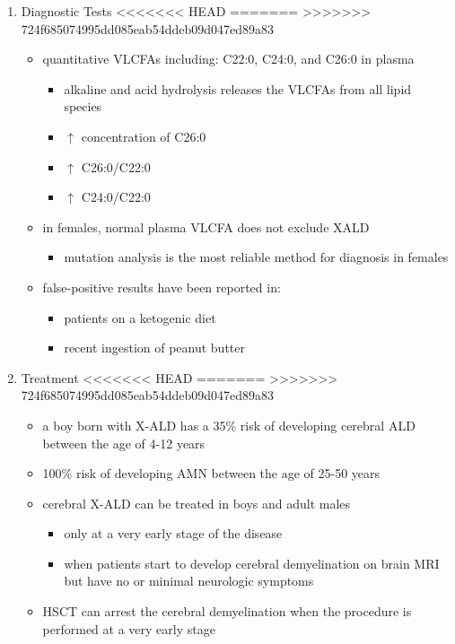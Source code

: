 \documentclass[fontsize=12pt]{scrartcl}
\begin{document}
\begin{enumerate}
\begin{enumerate}
\begin{enumerate}
\begin{enumerate}
\begin{table}[htbp]
\begin{enumerate}
\begin{enumerate}
\begin{enumerate}
\begin{enumerate}
\begin{enumerate}
\begin{enumerate}
\begin{enumerate}
\begin{enumerate}
\begin{enumerate}
\item Diagnostic Tests
<<<<<<< HEAD
\label{sec:org8cd4202}
=======
\label{sec:org53d04ea}
>>>>>>> 724f685074995dd085eab54ddeb09d047ed89a83
\begin{itemize}
\item quantitative VLCFAs including: C22:0, C24:0, and C26:0 in plasma
\begin{itemize}
\item alkaline and acid hydrolysis releases the VLCFAs from all lipid
species
\item \(\uparrow\) concentration of C26:0
\item \(\uparrow\) C26:0/C22:0
\item \(\uparrow\) C24:0/C22:0
\end{itemize}

\item in females, normal plasma VLCFA does not exclude XALD
\begin{itemize}
\item mutation analysis is the most reliable method for diagnosis in females
\end{itemize}

\item false-positive results have been reported in:
\begin{itemize}
\item patients on a ketogenic diet
\item recent ingestion of peanut butter
\end{itemize}
\end{itemize}

\item Treatment
<<<<<<< HEAD
\label{sec:orgb975dda}
=======
\label{sec:org1f74f5f}
>>>>>>> 724f685074995dd085eab54ddeb09d047ed89a83
\begin{itemize}
\item a boy born with X-ALD has a 35\% risk of developing cerebral ALD
between the age of 4-12 years
\item 100\% risk of developing AMN between the age of 25-50 years
\item cerebral X-ALD can be treated in boys and adult males
\begin{itemize}
\item only at a very early stage of the disease
\item when patients start to develop cerebral demyelination on brain MRI
but have no or minimal neurologic symptoms
\end{itemize}
\item HSCT can arrest the cerebral demyelination when the procedure is
performed at a very early stage
\end{itemize}
\end{enumerate}


\end{enumerate}
\end{enumerate}
\end{enumerate}
\end{enumerate}
\end{enumerate}
\end{enumerate}
\end{enumerate}
\end{enumerate}
\end{table}
\end{enumerate}
\end{enumerate}
\end{enumerate}
\end{enumerate}
\end{document}
